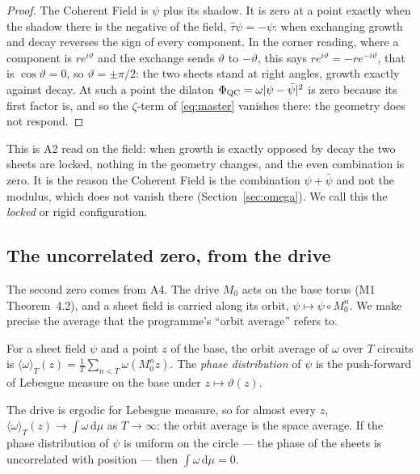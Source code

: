 \begin{proof}
The Coherent Field is $\psi$ plus its shadow. It is zero at a point exactly
when the shadow there is the negative of the field, $\hat\tau\psi=-\psi$:
when exchanging growth and decay reverses the sign of every component. In
the corner reading, where a component is $re^{i\vartheta}$ and the exchange
sends $\vartheta$ to $-\vartheta$, this says $re^{i\vartheta}=-re^{-i\vartheta}$,
that is $\cos\vartheta=0$, so $\vartheta=\pm\pi/2$: the two sheets stand at
right angles, growth exactly against decay. At such a point the dilaton
$\Phi_{\mathrm{QC}}=\omega\lvert\psi-\bar\psi\rvert^{2}$ is zero because its first factor is,
and so the $\zeta$-term of \eqref{eq:master} vanishes there: the geometry
does not respond. \rigR
\end{proof}

This is A2 read on the field: when growth is exactly opposed by decay the
two sheets are locked, nothing in the geometry changes, and the even
combination is zero. It is the reason the Coherent Field is the
combination $\psi+\bar\psi$ and not the modulus, which does not vanish
there (Section~\ref{sec:omega}). We call this the \emph{locked} or rigid
configuration.

\subsection{The uncorrelated zero, from the drive}\label{sec:uncorrelated}

The second zero comes from A4. The drive $M_{0}$ acts on the base torus
(M1 Theorem~4.2), and a sheet field is carried along its orbit,
$\psi\mapsto\psi\circ M_{0}^{n}$. We make precise the average that the
programme's ``orbit average'' refers to.

\begin{definition}\label{def:orbit-average}
For a sheet field $\psi$ and a point $z$ of the base, the orbit average of
$\omega$ over $T$ circuits is
$\langle\omega\rangle_{T}(z)=\tfrac1T\sum_{n<T}\omega(M_{0}^{n}z)$. The
\emph{phase distribution} of $\psi$ is the push-forward of Lebesgue
measure on the base under $z\mapsto\vartheta(z)$.
\end{definition}

\begin{proposition}\label{prop:uncorrelated}
The drive is ergodic for Lebesgue measure, so for almost every $z$,
$\langle\omega\rangle_{T}(z)\to\int\omega\,\mathrm{d}\mu$ as $T\to\infty$:
the orbit average is the space average. If the phase distribution of
$\psi$ is uniform on the circle --- the phase of the sheets is
uncorrelated with position --- then $\int\omega\,\mathrm{d}\mu=0$.
\end{proposition}

